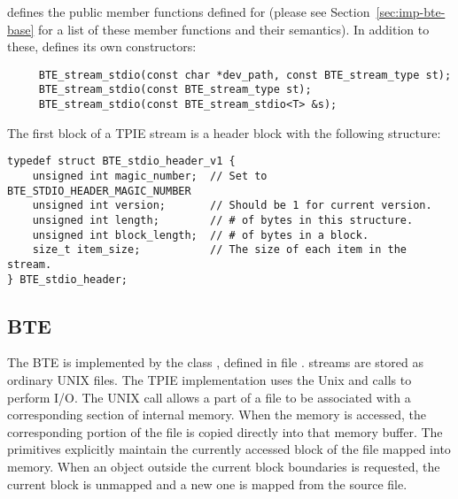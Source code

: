  defines the public member
functions defined for  (please
see Section~\ref{sec:imp-bte-base} for a list of these
member functions and their semantics).   In addition to these,
 defines its own
constructors:

\begin{verbatim}
     BTE_stream_stdio(const char *dev_path, const BTE_stream_type st); 
     BTE_stream_stdio(const BTE_stream_type st); 
     BTE_stream_stdio(const BTE_stream_stdio<T> &s);
\end{verbatim}

The first block of a TPIE  stream is a header
block
 with the following structure:

\begin{verbatim}
typedef struct BTE_stdio_header_v1 { 
    unsigned int magic_number;  // Set to BTE_STDIO_HEADER_MAGIC_NUMBER
    unsigned int version;       // Should be 1 for current version.
    unsigned int length;        // # of bytes in this structure.
    unsigned int block_length;  // # of bytes in a block.
    size_t item_size;           // The size of each item in the stream.
} BTE_stdio_header;
\end{verbatim}




\subsection{BTE }

The  BTE is implemented by the class
, defined in file
.  
streams are stored as ordinary UNIX files.  The TPIE
 implementation uses the Unix
 and  calls to perform I/O. The
UNIX  call allows a part of a file to be
associated with a corresponding section of internal memory.
When the memory is accessed, the corresponding portion of
the file is copied directly into that memory buffer. The
 primitives explicitly maintain the
currently accessed block of the file mapped into memory.
When an object outside the current block boundaries is
requested, the current block is unmapped and a new one is
mapped from the source file.

